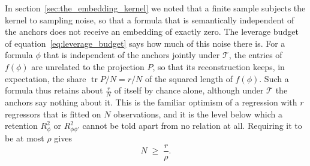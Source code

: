 \documentclass[titlepage,a4paper,11pt]{report}
\begin{document}
    In section~\ref{sec:the_embedding_kernel} we noted that a finite sample subjects the kernel to sampling noise, so that a formula that is semantically independent of the anchors does not receive an embedding of exactly zero. The leverage budget of equation~\eqref{eq:leverage_budget} says how much of this noise there is. For a formula $\phi$ that is independent of the anchors jointly under $\mathcal T$, the entries of $f(\phi)$ are unrelated to the projection $P$, so that its reconstruction keeps, in expectation, the share $\operatorname{tr}P/N=r/N$ of the squared length of $f(\phi)$. Such a formula thus retains about $\frac rN$ of itself by chance alone, although under $\mathcal T$ the anchors say nothing about it. This is the familiar optimism of a regression with $r$ regressors that is fitted on $N$ observations, and it is the level below which a retention $R^2_\phi$ or $R^2_{\phi\phi'}$ cannot be told apart from no relation at all. Requiring it to be at most $\rho$ gives
    \begin{equation}\label{eq:n_retention}
        N\;\ge\;\frac r\rho .
    \end{equation}
 
\end{document}

